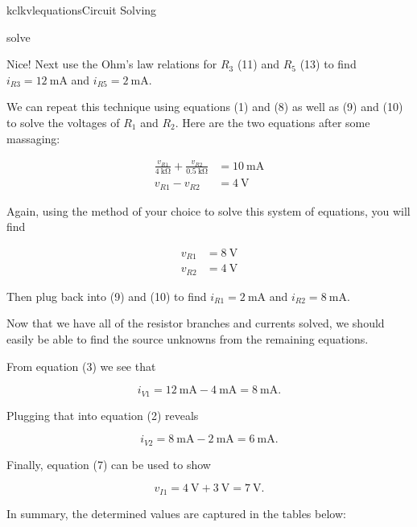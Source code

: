 \begin{mainquestion}{kclkvlequations}{Circuit Solving}
\begin{partquestion}{solve}
\begin{answer}
Nice! Next use the Ohm's law relations for $R_3$ (11) and $R_5$ (13) to find
$i_{R3}=\qty{12}{\milli\ampere}$ and
$i_{R5}=\qty{2}{\milli\ampere}$.

We can repeat this technique using equations (1) and (8) as well as (9) and (10) to solve the voltages of $R_1$ and $R_2$. Here are the two equations after some massaging:

\begin{align*}
\frac{v_{R1}}{\qty{4}{\kilo\ohm}}
+
\frac{v_{R2}}{\qty{0.5}{\kilo\ohm}}
&=
\qty{10}{\milli\ampere} \\
v_{R1}-v_{R2}
&=
\qty{4}{\volt}
\end{align*}

Again, using the method of your choice to solve this system of equations, you will find

\begin{align*}
v_{R1} &= \qty{8}{\volt} \\
v_{R2} &= \qty{4}{\volt}
\end{align*}

Then plug back into (9) and (10) to find
$i_{R1}=\qty{2}{\milli\ampere}$ and
$i_{R2}=\qty{8}{\milli\ampere}$.

Now that we have all of the resistor branches and currents solved, we should easily be able to find the source unknowns from the remaining equations.

From equation (3) we see that

\[
i_{V1}
=
\qty{12}{\milli\ampere}
-
\qty{4}{\milli\ampere}
=
\qty{8}{\milli\ampere}.
\]

Plugging that into equation (2) reveals

\[
i_{V2}
=
\qty{8}{\milli\ampere}
-
\qty{2}{\milli\ampere}
=
\qty{6}{\milli\ampere}.
\]

Finally, equation (7) can be used to show

\[
v_{I1}
=
\qty{4}{\volt}
+
\qty{3}{\volt}
=
\qty{7}{\volt}.
\]

In summary, the determined values are captured in the tables below:

\begin{table}[htbp]
\centering


\end{table}
\end{answer}
\end{partquestion}
\end{mainquestion}
